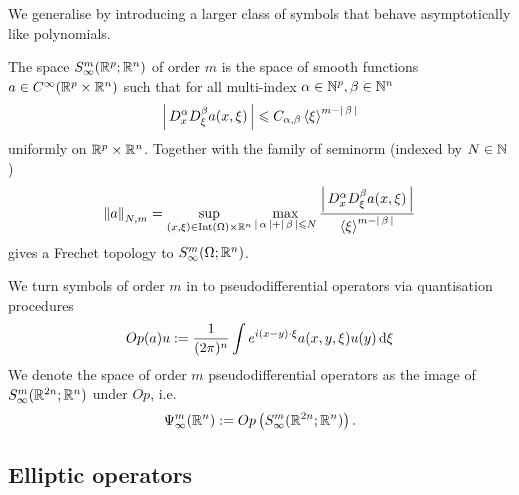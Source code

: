 \documentclass{article}
\begin{document}
We generalise by introducing a larger class of symbols that behave asymptotically like polynomials.  
\begin{fdefinition}
    The space $S^m_\infty(\R^p; \R^n)$ of order $m$ is the space of smooth functions $a \in C^\infty(\R^p \times \R^n)$ such that for all multi-index $\alpha \in \N^p, \beta \in \N^n$
    \begin{align*}
    \abs{D^\alpha_x D^\beta_\xi a (x, \xi)} \leq C_{\alpha, \beta} \sym[\xi]^{m - \abs{\beta}} 
    \end{align*}
    uniformly on $\R^p \times \R^n$. Together with the family of seminorm (indexed by $N \in \N$) 
    \begin{align*}
    \norm[a]_{N, m} = \sup_{(x, \xi) \in \mathrm{Int}(\Omega) \times \R^n} \max_{\abs{\alpha} + \abs{\beta} \leq N} \frac{\abs{D^\alpha_x D^\beta_\xi a(x, \xi)}}{\sym[\xi]^{m - \abs{\beta}}} 
    \end{align*}
    gives a Frechet topology to $S^m_\infty(\Omega; \R^n)$. \\
\end{fdefinition}

We turn symbols of order $m$ in to pseudodifferential operators via quantisation procedures  
\begin{align*}
Op(a)u := \frac{1}{(2\pi)^n} \int e^{i(x - y) \cdot \xi} a(x, y, \xi) u(y) \d[\xi]
\end{align*}
We denote the space of order $m$ pseudodifferential operators as the image of $S^{m}_\infty(\R^{2n}; \R^n)$ under $Op$, i.e. 
\begin{align*}
\Psi^{m}_{\infty}(\R^n) := Op\brac{S^{m}_\infty(\R^{2n}; \R^n)}. 
\end{align*}

\subsection{Elliptic operators}

\end{document}
